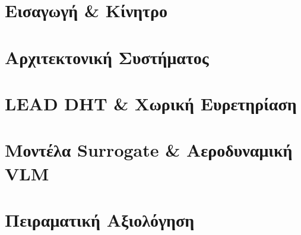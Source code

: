 \documentclass[10pt,aspectratio=169,compress]{beamer}
\begin{document}


\section{Εισαγωγή \& Κίνητρο}



\section{Αρχιτεκτονική Συστήματος}




\section{LEAD DHT \& Χωρική Ευρετηρίαση}



\section{Μοντέλα Surrogate \& Αεροδυναμική VLM}




\section{Πειραματική Αξιολόγηση}





\end{document}
